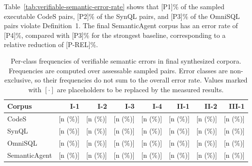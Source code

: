 \documentclass[letterpaper,journal]{IEEEtran}
\begin{document}
\begin{table}[!t]
\centering
\caption{Human-evaluated semantic error rates in final synthesized corpora. Error rates are computed over assessable sampled pairs. Values marked with $[\cdot]$ are placeholders to be replaced by the measured results.}
\label{tab:verifiable-semantic-error-rate}
\small
\setlength{\tabcolsep}{4pt}
\end{table}

Table~\ref{tab:verifiable-semantic-error-rate} shows that [P1]\% of the sampled executable CodeS pairs, [P2]\% of the SynQL pairs, and [P3]\% of the OmniSQL pairs violate Definition~1. The final SemanticAgent corpus has an error rate of [P4]\%, compared with [P3]\% for the strongest baseline, corresponding to a relative reduction of [P-REL]\%.

\begin{table}[!t]
\centering
\caption{Per-class frequencies of verifiable semantic errors in final synthesized corpora. Frequencies are computed over assessable sampled pairs. Error classes are non-exclusive, so their frequencies do not sum to the overall error rate. Values marked with $[\cdot]$ are placeholders to be replaced by the measured results.}
\label{tab:semantic-error-type-frequency}
\small
\setlength{\tabcolsep}{4pt}
\begin{tabular}{lrrrrrrr}
\toprule
\textbf{Corpus} & \textbf{I-1} & \textbf{I-2} & \textbf{I-3} & \textbf{I-4} & \textbf{II-1} & \textbf{II-2} & \textbf{III-1} \\
\midrule
CodeS & [n (\%)] & [n (\%)] & [n (\%)] & [n (\%)] & [n (\%)] & [n (\%)] & [n (\%)] \\
SynQL & [n (\%)] & [n (\%)] & [n (\%)] & [n (\%)] & [n (\%)] & [n (\%)] & [n (\%)] \\
OmniSQL & [n (\%)] & [n (\%)] & [n (\%)] & [n (\%)] & [n (\%)] & [n (\%)] & [n (\%)] \\
SemanticAgent & [n (\%)] & [n (\%)] & [n (\%)] & [n (\%)] & [n (\%)] & [n (\%)] & [n (\%)] \\
\bottomrule
\end{tabular}
\end{table}
\end{document}

